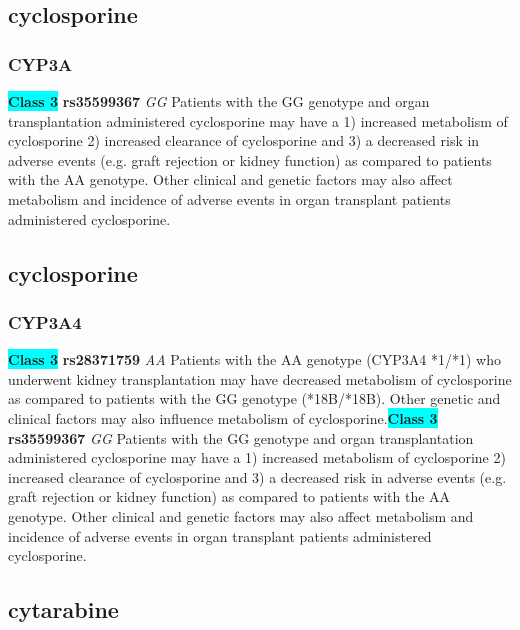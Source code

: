 \documentclass{book}
\begin{document}
\begin{center}



\end{center}\subsection{ cyclosporine }


\subsubsection{ CYP3A }

\begin{center}
\textbf{\colorbox{cyan} {Class 3}} \textbf{ rs35599367 } \textit{ GG }
Patients with the GG genotype and organ transplantation administered cyclosporine may have a 1) increased metabolism of cyclosporine 2) increased clearance of cyclosporine and 3) a decreased risk in adverse events (e.g. graft rejection or kidney function) as compared to patients with the AA genotype. Other clinical and genetic factors may also affect metabolism and incidence of adverse events in organ transplant patients administered cyclosporine. 


\end{center}\subsection{ cyclosporine }


\subsubsection{ CYP3A4 }

\begin{center}
\textbf{\colorbox{cyan} {Class 3}} \textbf{ rs28371759 } \textit{ AA }
Patients with the AA genotype (CYP3A4 *1/*1) who underwent kidney transplantation may have decreased metabolism of cyclosporine as compared to patients with the GG genotype (*18B/*18B). Other genetic and clinical factors may also influence metabolism of cyclosporine.\textbf{\colorbox{cyan} {Class 3}} \textbf{ rs35599367 } \textit{ GG }
Patients with the GG genotype and organ transplantation administered cyclosporine may have a 1) increased metabolism of cyclosporine 2) increased clearance of cyclosporine and 3) a decreased risk in adverse events (e.g. graft rejection or kidney function) as compared to patients with the AA genotype. Other clinical and genetic factors may also affect metabolism and incidence of adverse events in organ transplant patients administered cyclosporine. 


\end{center}\subsection{ cytarabine }
\end{document}
